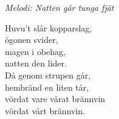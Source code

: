 {\footnotesize\textit{Melodi: Natten går tunga fjät}}\par
\vspace{10pt}
Huvu’t slår kopparslag,\\
ögonen svider,\\
magen i obehag,\\
natten den lider.\\
Då genom strupen går,\\
hembränd en liten tår,\\
vördat vare vårat brännvin\\
vördat vårt brännvin.
